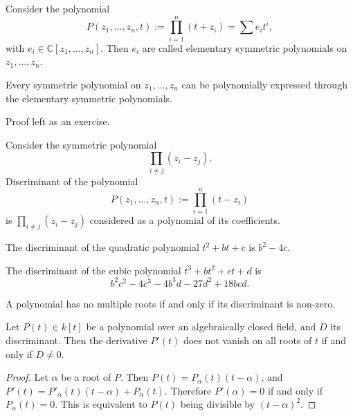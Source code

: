 \begin{definition}
\label{definition-elementary-symmetric-polynomial}
Consider the polynomial
$$
P(z_1,\dots,z_n,t):=\prod_{i=1}^n(t+z_i)
=\sum e_it^i,
$$
with $e_i \in \mathbb{C}[z_1,\dots,z_n]$.
Then $e_i$ are called elementary symmetric
polynomials on $z_1,\dots,z_n$.
\end{definition}

\begin{theorem}
\label{theorem-symmetric-polynomial-generated}
Every symmetric polynomial on
$z_1,\dots,z_n$ can be polynomially
expressed through the elementary symmetric
polynomials.
\end{theorem}

\medskip\noindent
Proof left as an exercise.

\begin{definition}
\label{definition-discriminant}
Consider the symmetric polynomial
$$
\prod_{i\neq j}(z_i-z_j).
$$
Discriminant of the polynomial
$$
P(z_1,\dots,z_n,t):=\prod_{i=1}^n(t-z_i)
$$
is $\prod_{i\neq j}(z_i-z_j)$ considered as
a polynomial of its coefficients.
\end{definition}

\begin{example}
The discriminant of the quadratic polynomial
$t^2+bt+c$ is $b^2-4c$.
\end{example}

\begin{example}
The discriminant of the cubic polynomial
$t^3+bt^2+ct+d$ is
$$
b^2c^2-4c^3-4b^3d-27d^2+18bcd.
$$
\end{example}

\begin{lemma}
\label{lemma-polynomial-no-multiple-roots}
A polynomial has no multiple roots if and
only if its discriminant is non-zero.
\end{lemma}

\begin{corollary}
\label{lemma-derivative-on-roots-and-discriminant}
Let $P(t)\in k[t]$ be a polynomial over an
algebraically closed field, and $D$ its
discriminant. Then the derivative $P'(t)$
does not vanish on all roots of $t$ if and
only if $D\neq 0$.
\end{corollary}

\begin{proof}
Let $\alpha$ be a root of $P$. Then
$P(t)=P_\alpha(t)(t-\alpha)$, and
$P'(t)=P'_\alpha(t)(t-\alpha)+P_\alpha(t)$.
Therefore $P'(\alpha)=0$ if and only if
$P_\alpha(t)=0$. This is equivalent to
$P(t)$ being divisible by $(t-\alpha)^2$.
\end{proof}

